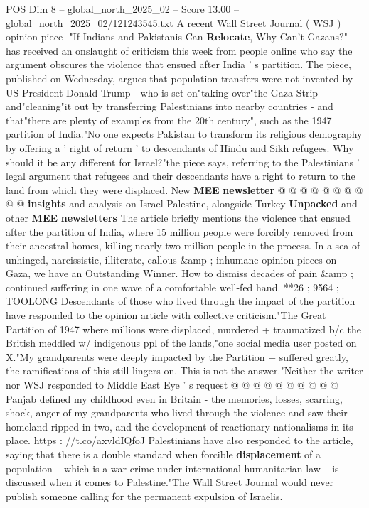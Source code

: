 \begin{textsample}{POS Dim 8 – global\_north\_2025\_02 – Score 13.00 – global\_north\_2025\_02/121243545.txt}  \label{ex:f8_pos_018}
A recent Wall Street Journal ( WSJ ) opinion piece -"If Indians and Pakistanis Can \textbf{Relocate}, Why Can't Gazans?"- has received an onslaught of criticism this week from people online who say the argument obscures the violence that ensued after India ' s partition.
The piece, published on Wednesday, argues that population transfers were not invented by US President Donald Trump - who is set on"taking over"the Gaza Strip and"cleaning"it out by transferring Palestinians into nearby countries - and that"there are plenty of examples from the 20th century", such as the 1947 partition of India."No one expects Pakistan to transform its religious demography by offering a ' right of return ' to descendants of Hindu and Sikh refugees.
Why should it be any different for Israel?"the piece says, referring to the Palestinians ' legal argument that refugees and their descendants have a right to return to the land from which they were displaced.
New \textbf{MEE} \textbf{newsletter} @ @ @ @ @ @ @ @ @ @ \textbf{insights} and analysis on Israel-Palestine, alongside Turkey \textbf{Unpacked} and other \textbf{MEE} \textbf{newsletters} The article briefly mentions the violence that ensued after the partition of India, where 15 million people were forcibly removed from their ancestral homes, killing nearly two million people in the process.
In a sea of unhinged, narcissistic, illiterate, callous \&amp ; inhumane opinion pieces on Gaza, we have an Outstanding Winner.
How to dismiss decades of pain \&amp ; continued suffering in one wave of a comfortable well-fed hand. **26 ; 9564 ; TOOLONG Descendants of those who lived through the impact of the partition have responded to the opinion article with collective criticism."The Great Partition of 1947 where millions were displaced, murdered + traumatized b/c the British meddled w/ indigenous ppl of the lands,"one social media user posted on X."My grandparents were deeply impacted by the Partition + suffered greatly, the ramifications of this still lingers on.
This is not the answer."Neither the writer nor WSJ responded to Middle East Eye ' s request @ @ @ @ @ @ @ @ @ @ Panjab defined my childhood even in Britain - the memories, losses, scarring, shock, anger of my grandparents who lived through the violence and saw their homeland ripped in two, and the development of reactionary nationalisms in its place. https : //t.co/axvldIQfoJ Palestinians have also responded to the article, saying that there is a double standard when forcible \textbf{displacement} of a population -- which is a war crime under international humanitarian law -- is discussed when it comes to Palestine."The Wall Street Journal would never publish someone calling for the permanent expulsion of Israelis.

\end{textsample}
